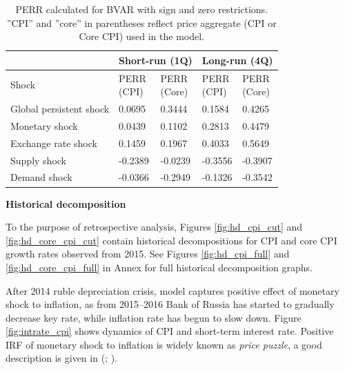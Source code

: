 \documentclass[12pt, a4paper]{extarticle}
\begin{document}
\begin{table}[h!!]
	\centering
	\begin{tabular}{@{}lllll@{}}
		\toprule
		& \multicolumn{2}{c}{Short-run (1Q)} & \multicolumn{2}{c}{Long-run (4Q)} \\
		\midrule
		Shock                   & \makecell[c]{PERR\\(CPI)}      & \makecell[c]{PERR\\(Core)}      & \makecell[c]{PERR\\(CPI)}      & \makecell[c]{PERR\\(Core)}     \\
		\midrule
		Global persistent shock & 0.0695          & 0.3444           & 0.1584          & 0.4265          \\
		Monetary shock          & 0.0439          & 0.1102           & 0.2813          & 0.4479          \\
		Exchange rate shock     & 0.1459          & 0.1967           & 0.4033          & 0.5649          \\
		Supply shock            & -0.2389         & -0.0239          & -0.3556         & -0.3907         \\
		Demand shock            & -0.0366         & -0.2949          & -0.1326         & -0.3542   \\
		\bottomrule
	\end{tabular}%
	\caption{PERR calculated for BVAR with sign and zero restrictions. ''CPI'' and ''core'' in parentheses reflect price aggregate (CPI or Core CPI) used in the model.}
	\label{tab:perr}
\end{table}

\begin{center}
	\textbf{Historical decomposition}
\end{center}

To the purpose of retrospective analysis, Figures \ref{fig:hd_cpi_cut} and \ref{fig:hd_core_cpi_cut} contain historical decompositions for CPI and core CPI growth rates observed from 2015. See Figures \ref{fig:hd_cpi_full} and \ref{fig:hd_core_cpi_full} in Annex for full historical decomposition graphs.

After 2014 ruble depreciation crisis, model captures positive effect of monetary shock to inflation, as from 2015--2016 Bank of Russia has started to gradually decrease key rate, while inflation rate has begun to slow down. Figure \ref{fig:intrate_cpi} shows dynamics of CPI and short-term interest rate. Positive IRF of monetary shock to inflation is widely known as \textit{price puzzle}, a good description is given in (\cite{Sims1992}; \cite{Christiano1994}). 
\end{document}
